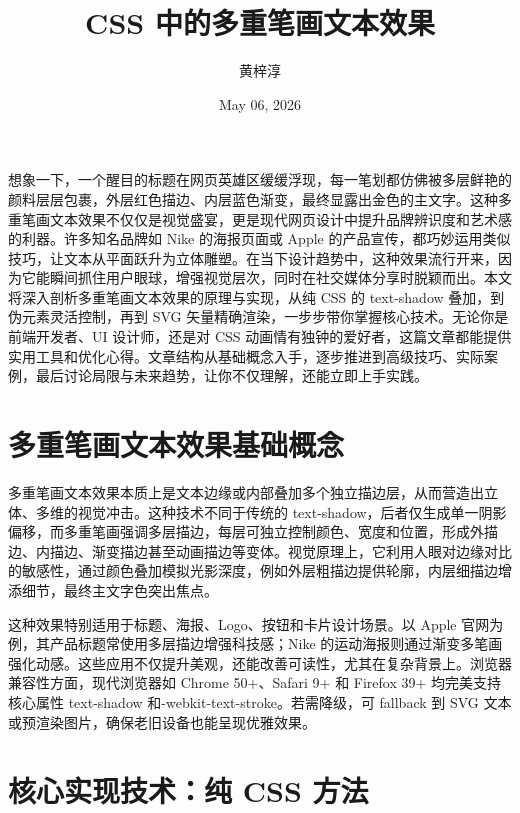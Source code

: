 \title{CSS 中的多重笔画文本效果}
\author{黄梓淳}
\date{May 06, 2026}
\maketitle
想象一下，一个醒目的标题在网页英雄区缓缓浮现，每一笔划都仿佛被多层鲜艳的颜料层层包裹，外层红色描边、内层蓝色渐变，最终显露出金色的主文字。这种多重笔画文本效果不仅仅是视觉盛宴，更是现代网页设计中提升品牌辨识度和艺术感的利器。许多知名品牌如 Nike 的海报页面或 Apple 的产品宣传，都巧妙运用类似技巧，让文本从平面跃升为立体雕塑。在当下设计趋势中，这种效果流行开来，因为它能瞬间抓住用户眼球，增强视觉层次，同时在社交媒体分享时脱颖而出。本文将深入剖析多重笔画文本效果的原理与实现，从纯 CSS 的 text-shadow 叠加，到伪元素灵活控制，再到 SVG 矢量精确渲染，一步步带你掌握核心技术。无论你是前端开发者、UI 设计师，还是对 CSS 动画情有独钟的爱好者，这篇文章都能提供实用工具和优化心得。文章结构从基础概念入手，逐步推进到高级技巧、实际案例，最后讨论局限与未来趋势，让你不仅理解，还能立即上手实践。\par
\chapter{多重笔画文本效果基础概念}
多重笔画文本效果本质上是文本边缘或内部叠加多个独立描边层，从而营造出立体、多维的视觉冲击。这种技术不同于传统的 text-shadow，后者仅生成单一阴影偏移，而多重笔画强调多层描边，每层可独立控制颜色、宽度和位置，形成外描边、内描边、渐变描边甚至动画描边等变体。视觉原理上，它利用人眼对边缘对比的敏感性，通过颜色叠加模拟光影深度，例如外层粗描边提供轮廓，内层细描边增添细节，最终主文字色突出焦点。\par
这种效果特别适用于标题、海报、Logo、按钮和卡片设计场景。以 Apple 官网为例，其产品标题常使用多层描边增强科技感；Nike 的运动海报则通过渐变多笔画强化动感。这些应用不仅提升美观，还能改善可读性，尤其在复杂背景上。浏览器兼容性方面，现代浏览器如 Chrome 50+、Safari 9+ 和 Firefox 39+ 均完美支持核心属性 text-shadow 和-webkit-text-stroke。若需降级，可 fallback 到 SVG 文本或预渲染图片，确保老旧设备也能呈现优雅效果。\par
\chapter{核心实现技术：纯 CSS 方法}
